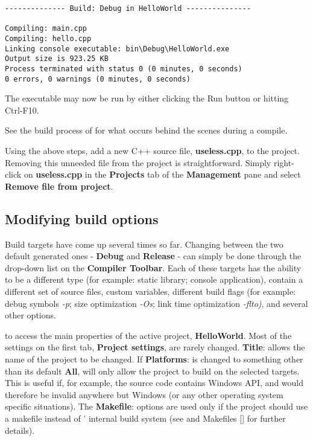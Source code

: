 \begin{lstlisting}
-------------- Build: Debug in HelloWorld ---------------

Compiling: main.cpp
Compiling: hello.cpp
Linking console executable: bin\Debug\HelloWorld.exe
Output size is 923.25 KB
Process terminated with status 0 (0 minutes, 0 seconds)
0 errors, 0 warnings (0 minutes, 0 seconds)
\end{lstlisting}

The executable may now be run by either clicking the Run button or hitting Ctrl-F10.


See the build process of \codeblocks for what occurs behind the scenes during a compile.


Using the above steps, add a new C++ source file, \textbf{useless.cpp}, to the project. Removing this unneeded file from the project is straightforward. Simply right-click on \textbf{useless.cpp} in the \textbf{Projects} tab of the \textbf{Management} pane and select \textbf{Remove file from project}.

 


\subsection{Modifying build options}
 
Build targets have come up several times so far. Changing between the two default generated ones - \textbf{Debug} and \textbf{Release} - can simply be done through the drop-down list on the \textbf{Compiler Toolbar}. Each of these targets has the ability to be a different type (for example: static library; console application), contain a different set of source files, custom variables, different build flags (for example: debug symbols \textit{-p}; size optimization \textit{-Os}; link time optimization \textit{-flto)}, and several other options.
 
 
 to access the main properties of the active project, \textbf{HelloWorld}. Most of the settings on the first tab, \textbf{Project settings}, are rarely changed. \textbf{Title}: allows the name of the project to be changed. If \textbf{Platforms}: is changed to something other than its default \textbf{All}, \codeblocks will only allow the project to build on the selected targets. This is useful if, for example, the source code contains Windows API, and would therefore be invalid anywhere but Windows (or any other operating system specific situations). The \textbf{Makefile}: options are used only if the project should use a makefile instead of \codeblocks' internal build system (see \codeblocks and Makefiles [] for further details).

